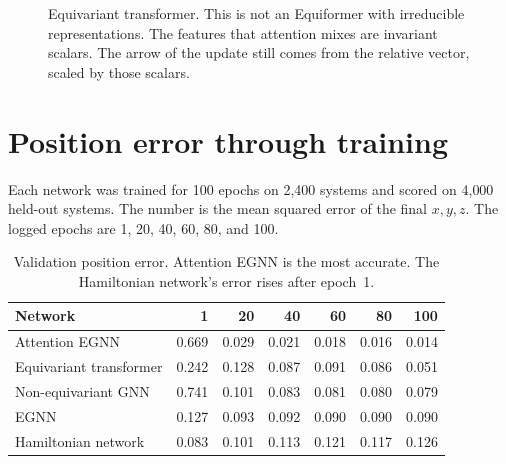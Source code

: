 \documentclass[11pt]{article}
\begin{document}
\begin{figure}[ht]
\centering
{}
\caption{Equivariant transformer.
This is not an Equiformer with irreducible representations.
The features that attention mixes are invariant scalars.
The arrow of the update still comes from the relative vector, scaled by those scalars.}
\label{fig:eqt}
\end{figure}

\section{Position error through training}

Each network was trained for 100 epochs on 2{,}400 systems and scored on 4{,}000 held-out systems.
The number is the mean squared error of the final $x,y,z$.
The logged epochs are 1, 20, 40, 60, 80, and 100.

\begin{table}[ht]
\centering
\caption{Validation position error.
Attention EGNN is the most accurate.
The Hamiltonian network's error rises after epoch~1.}
\label{tab:mse}
\begin{tabular}{lrrrrrr}
\toprule
Network & 1 & 20 & 40 & 60 & 80 & 100 \\
\midrule
Attention EGNN & 0.669 & 0.029 & 0.021 & 0.018 & 0.016 & 0.014 \\
Equivariant transformer & 0.242 & 0.128 & 0.087 & 0.091 & 0.086 & 0.051 \\
Non-equivariant GNN & 0.741 & 0.101 & 0.083 & 0.081 & 0.080 & 0.079 \\
EGNN & 0.127 & 0.093 & 0.092 & 0.090 & 0.090 & 0.090 \\
Hamiltonian network & 0.083 & 0.101 & 0.113 & 0.121 & 0.117 & 0.126 \\
\bottomrule
\end{tabular}
\end{table}
\end{document}
